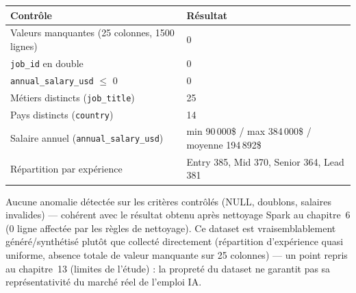 \begin{center}
\begin{tabular}{ll}
\toprule
Contrôle & Résultat \\
\midrule
Valeurs manquantes (25 colonnes, 1500 lignes) & 0 \\
\texttt{job\_id} en double & 0 \\
\texttt{annual\_salary\_usd} $\leq$ 0 & 0 \\
Métiers distincts (\texttt{job\_title}) & 25 \\
Pays distincts (\texttt{country}) & 14 \\
Salaire annuel (\texttt{annual\_salary\_usd}) & min 90\,000\$ / max 384\,000\$ / moyenne 194\,892\$ \\
Répartition par expérience & Entry 385, Mid 370, Senior 364, Lead 381 \\
\bottomrule
\end{tabular}
\end{center}

\begin{constat}
Aucune anomalie détectée sur les critères contrôlés (NULL, doublons,
salaires invalides) — cohérent avec le résultat obtenu après nettoyage
Spark au chapitre~6 (0 ligne affectée par les règles de nettoyage). Ce
dataset est vraisemblablement généré/synthétisé plutôt que collecté
directement (répartition d'expérience quasi uniforme, absence totale de
valeur manquante sur 25 colonnes) — un point repris au chapitre~13
(limites de l'étude) : la propreté du dataset ne garantit pas sa
représentativité du marché réel de l'emploi IA.
\end{constat}
